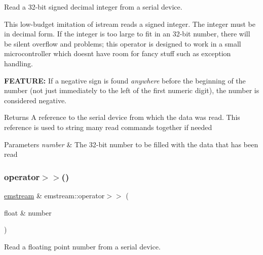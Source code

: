 Read a 32-\/bit signed decimal integer from a serial device. 

This low-\/budget imitation of {\ttfamily istream} reads a signed integer. The integer must be in decimal form. If the integer is too large to fit in an 32-\/bit number, there will be silent overflow and problems; this operator is designed to work in a small microcontroller which doesn\textquotesingle{}t have room for fancy stuff such as exception handling. \begin{DoxyItemize}
\item {\bfseries F\+E\+A\+T\+U\+RE\+:} If a negative sign is found {\itshape anywhere} before the beginning of the number (not just immediately to the left of the first numeric digit), the number is considered negative. \begin{DoxyReturn}{Returns}
A reference to the serial device from which the data was read. This reference is used to string many read commands together if needed 
\end{DoxyReturn}

\begin{DoxyParams}{Parameters}
{\em number} & The 32-\/bit number to be filled with the data that has been read \\
\hline
\end{DoxyParams}
\end{DoxyItemize}
\mbox{\label{classemstream_a9f4e98aa62243663dbbc4d1097e17d54}} 
\subsubsection{\texorpdfstring{operator$>$$>$()}{operator>>()}\hspace{0.1cm}{\footnotesize\ttfamily [8/8]}}
{\footnotesize\ttfamily \mbox{\hyperlink{classemstream}{emstream}} \& emstream\+::operator$>$$>$ (\begin{DoxyParamCaption}\item[{float \&}]{number }\end{DoxyParamCaption})}



Read a floating point number from a serial device. 

